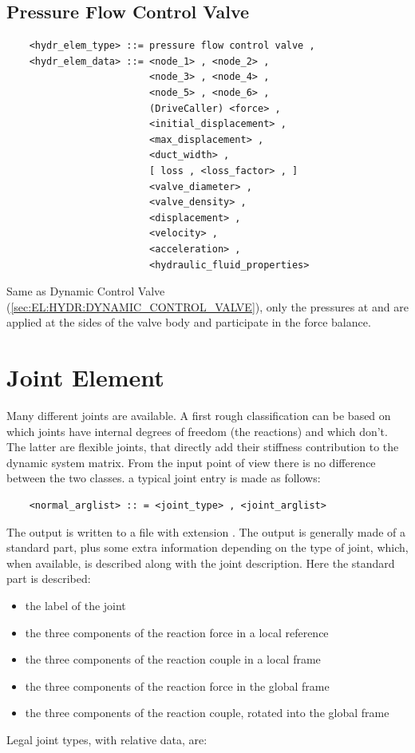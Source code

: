 \subsection{Pressure Flow Control Valve}
\begin{verbatim}
    <hydr_elem_type> ::= pressure flow control valve ,
    <hydr_elem_data> ::= <node_1> , <node_2> ,
                         <node_3> , <node_4> ,
                         <node_5> , <node_6> ,
                         (DriveCaller) <force> ,
                         <initial_displacement> ,
                         <max_displacement> ,
                         <duct_width> ,
                         [ loss , <loss_factor> , ]
                         <valve_diameter> ,
                         <valve_density> ,
                         <displacement> ,
                         <velocity> ,
                         <acceleration> ,
                         <hydraulic_fluid_properties>
\end{verbatim}
Same as Dynamic Control Valve (\ref{sec:EL:HYDR:DYNAMIC_CONTROL_VALVE}),
only the pressures at  and  are applied
at the sides of the valve body and participate in the force balance.



\section{Joint Element}
Many different joints are available. A first rough classification can be
based on which joints have internal degrees of freedom (the reactions) and
which don't. The latter are flexible joints, that directly add their
stiffness contribution to the dynamic system matrix. From the input point
of view there is no difference between the two classes.
a typical joint entry is made as follows:
\begin{verbatim}
    <normal_arglist> :: = <joint_type> , <joint_arglist>
\end{verbatim}
The output is written to a file with extension .
The output is generally made of a standard part, plus some extra information
depending on the type of joint, which, when available, is described along
with the joint description.
Here the standard part is described:
\begin{itemize}
    \item the label of the joint
    \item the three components of the reaction force in a local reference
    \item the three components of the reaction couple in a local frame
    \item the three components of the reaction force in the global frame
    \item the three components of the reaction couple, rotated into the
          global frame
\end{itemize}
Legal joint types, with relative data, are:




